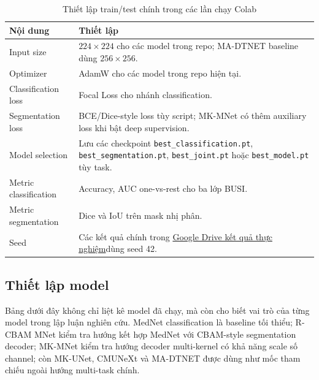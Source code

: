 \documentclass[12pt,a4paper]{article}
\newcommand{\resultdrive}{\href{https://drive.google.com/drive/folders/1ZFqnT5X12mwOahLquEp8JkauidLAaHGb}{Google Drive kết quả thực nghiệm}}
\begin{document}
\begin{table}[H]
\centering
\caption{Thiết lập train/test chính trong các lần chạy Colab}
\renewcommand{\arraystretch}{1.25}
\begin{tabular}{p{4.2cm} p{9.6cm}}
\toprule
\textbf{Nội dung} & \textbf{Thiết lập} \\
\midrule
Input size & \(224 \times 224\) cho các model trong repo; MA-DTNET baseline dùng \(256 \times 256\). \\
Optimizer & AdamW cho các model trong repo hiện tại. \\
Classification loss & Focal Loss cho nhánh classification. \\
Segmentation loss & BCE/Dice-style loss tùy script; MK-MNet có thêm auxiliary loss khi bật deep supervision. \\
Model selection & Lưu các checkpoint \texttt{best\_classification.pt}, \texttt{best\_segmentation.pt}, \texttt{best\_joint.pt} hoặc \texttt{best\_model.pt} tùy task. \\
Metric classification & Accuracy, AUC one-vs-rest cho ba lớp BUSI. \\
Metric segmentation & Dice và IoU trên mask nhị phân. \\
Seed & Các kết quả chính trong \resultdrive dùng seed 42. \\
\bottomrule
\end{tabular}
\end{table}

\subsection{Thiết lập model}

Bảng dưới đây không chỉ liệt kê model đã chạy, mà còn cho biết vai trò của từng model trong lập luận nghiên cứu. MedNet classification là baseline tối thiểu; R-CBAM MNet kiểm tra hướng kết hợp MedNet với CBAM-style segmentation decoder; MK-MNet kiểm tra hướng decoder multi-kernel có khả năng scale số channel; còn MK-UNet, CMUNeXt và MA-DTNET được dùng như mốc tham chiếu ngoài hướng multi-task chính.
\end{document}

